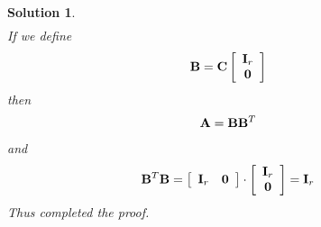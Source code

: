 \documentclass[11pt]{article}\usepackage[]{graphicx}\usepackage[]{color}
\newtheorem{sol}{Solution}
\begin{document}
\begin{sol}
\begin{align*}
	\end{align*}
	If we define
	\begin{align*}
		{\bf B} &= {\bf C}\left[\begin{array}{c}{\bf I}_r\\ {\bf 0}\end{array}\right]
	\end{align*}
	then 
	\begin{align*}
		{\bf A} &= {\bf B}{\bf B}^T
	\end{align*}
	and
	\begin{align*}
		{\bf B}^T{\bf B} &= \left[\begin{array}{cc} {\bf I}_r& {\bf 0}\end{array}\right]\cdot \left[\begin{array}{c}{\bf I}_r\\ {\bf 0}\end{array}\right] = {\bf I}_r
	\end{align*}
	Thus completed the proof.
\end{sol}
\end{document}
